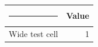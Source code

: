\documentclass[mathematics,article,submit,moreauthors]{Definitions/mdpi}
\renewcommand{\caption}[2][]{}
\begin{document}
\begin{table}[H]
\caption{Width fallback smoke test (not manuscript content).}
\centering\small
\begin{tabular}{lr}\toprule
\rule{410pt}{0pt} & Value\\\midrule
Wide test cell & 1\\\bottomrule
\end{tabular}
\end{table}
\end{document}

